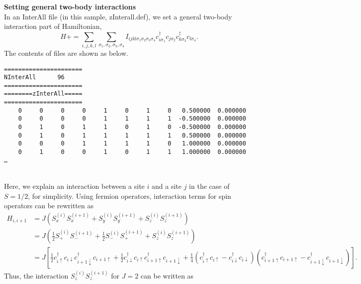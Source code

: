 \begin{description}
\item {\bf Setting general two-body interactions}\\
In an InterAll file (in this sample, zInterall.def), we set a general two-body interaction part of Hamiltonian,
\begin{equation}
H+=\sum_{i,j,k,l}\sum_{\sigma_1,\sigma_2, \sigma_3, \sigma_4}
I_{ijkl\sigma_1\sigma_2\sigma_3\sigma_4}c_{i\sigma_1}^{\dagger}c_{j\sigma_2}c_{k\sigma_3}^{\dagger}c_{l\sigma_4}.
\end{equation}
The contents of files are shown as below.\\
\begin{minipage}{16cm}
\begin{screen}
\begin{verbatim}
====================== 
NInterAll      96  
====================== 
========zInterAll===== 
====================== 
    0     0     0     0     1     0     1     0   0.500000  0.000000
    0     0     0     0     1     1     1     1  -0.500000  0.000000
    0     1     0     1     1     0     1     0  -0.500000  0.000000
    0     1     0     1     1     1     1     1   0.500000  0.000000
    0     0     0     1     1     1     1     0   1.000000  0.000000
    0     1     0     0     1     0     1     1   1.000000  0.000000
…
\end{verbatim}
\end{screen}
\end{minipage}
~\\
Here, we explain an interaction between a site $i$ and a site $j$ {in the case of $S=1/2$}, for simplicity. Using fermion operators, interaction terms for spin operators can be rewritten as
\begin{align}
H_{i,i+1}&=J(S_x^{(i)}S_x^{(i+1)}+S_y^{(i)}S_y^{(i+1)}+S_z^{(i)}S_z^{(i+1)}) \nonumber\\
&=J \left( \frac{1}{2}S_+^{(i)}S_-^{(i+1)}+\frac{1}{2}S_-^{(i)}S_+^{(i+1)}+S_z^{(i)}S_z^{(i+1)} \right) \nonumber\\
&=J \left[ \frac{1}{2}c_{i\uparrow}^{\dag}c_{i\downarrow}c_{i+1\downarrow}^{\dag}c_{i+1\uparrow}+\frac{1}{2}c_{i\downarrow}^{\dag}c_{i\uparrow}c_{i+1\uparrow}^{\dag}c_{i+1\downarrow}+\frac{1}{4}(c_{i\uparrow}^{\dag}c_{i\uparrow}-c_{i\downarrow}^{\dag}c_{i\downarrow})(c_{i+1\uparrow}^{\dag}c_{i+1\uparrow}-c_{i+1\downarrow}^{\dag}c_{i+1\downarrow}) \right]. \nonumber 
\end{align}
Thus, the interaction $S_z^{(i)}S_z^{(i+1)}$ for $J=2$ can be written as \\
\begin{minipage}{16cm}

\end{minipage}
\end{description}
